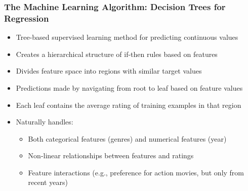 \documentclass{beamer}
\begin{document}
\begin{frame}
\frametitle{The Machine Learning Algorithm: Decision Trees for Regression}

\begin{itemize}
    \item Tree-based supervised learning method for predicting continuous values
    \item Creates a hierarchical structure of if-then rules based on features
    \item Divides feature space into regions with similar target values
    \item Predictions made by navigating from root to leaf based on feature values
    \item Each leaf contains the average rating of training examples in that region
    \item Naturally handles:
    \begin{itemize}
        \item Both categorical features (genres) and numerical features (year)
        \item Non-linear relationships between features and ratings
        \item Feature interactions (e.g., preference for action movies, but only from recent years)
    \end{itemize}
\end{itemize}
\end{frame}
\end{document}
